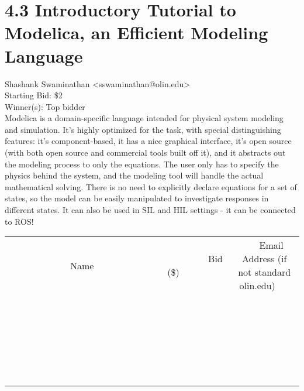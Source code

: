 \documentclass[11pt]{article}
\begin{document}
					\section*{4.3 Introductory Tutorial to Modelica, an Efficient Modeling Language}
					Shashank Swaminathan <sswaminathan@olin.edu> \\
					Starting Bid: \$2 \\
					Winner(s): Top bidder \\
					Modelica is a domain-specific language intended for physical system modeling and simulation. It's highly optimized for the task, with special distinguishing features: it's component-based, it has a nice graphical interface, it's open source (with both open source and commercial tools built off it), and it abstracts out the modeling process to only the equations. The user only has to specify the physics behind the system, and the modeling tool will handle the actual mathematical solving. There is no need to explicitly declare equations for a set of states, so the model can be easily manipulated to investigate responses in different states. It can also be used in SIL and HIL settings - it can be connected to ROS! \\
					[6ex]
					\begin{tabular}{c c c}
						~~~~~~~~~~~~~Name~~~~~~~~~~~~~ & ~~~~~~~~~Bid (\$)~~~~~~~~~ & ~~~Email Address (if not standard olin.edu)~~~ \\
				
 & & \\
\hline
 & & \\
\hline
 & & \\
\hline
 & & \\
\hline
 & & \\
\hline
 & & \\
\hline
 & & \\
\hline
 & & \\
\hline
 & & \\
\hline
 & & \\
\hline
 & & \\
\hline
 & & \\
\hline
 & & \\
\hline
 & & \\
\hline
 & & \\
\hline
 & & \\
\hline
 & & \\
\hline
 & & \\
\hline
 & & \\
\hline
 & & \\
\hline
 & & \\
\hline
 & & \\
\hline
 & & \\
\hline
 & & \\
\hline
 & & \\
\hline
 & & \\
\hline
					\end{tabular}
					\clearpage
				
\end{document}
